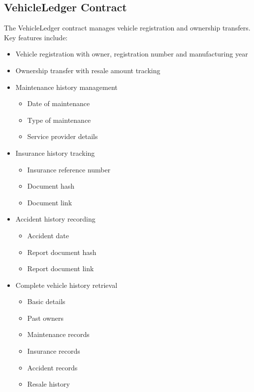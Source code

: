 \documentclass[12pt,a4paper]{article}
\begin{document}
    \subsection{VehicleLedger Contract}
    The VehicleLedger contract manages vehicle registration and ownership transfers. Key features include:
    \begin{itemize}
        \item Vehicle registration with owner, registration number and manufacturing year
        \item Ownership transfer with resale amount tracking
        \item Maintenance history management
        \begin{itemize}
            \item Date of maintenance
            \item Type of maintenance
            \item Service provider details
        \end{itemize}
        \item Insurance history tracking
        \begin{itemize}
            \item Insurance reference number
            \item Document hash
            \item Document link
        \end{itemize}
        \item Accident history recording
        \begin{itemize}
            \item Accident date
            \item Report document hash
            \item Report document link
        \end{itemize}
        \item Complete vehicle history retrieval
        \begin{itemize}
            \item Basic details
            \item Past owners
            \item Maintenance records
            \item Insurance records
            \item Accident records
            \item Resale history
        \end{itemize}
    \end{itemize}
\end{document}
